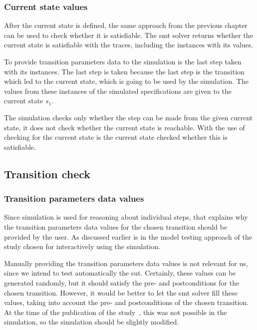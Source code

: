 \subsubsection*{Current state values}
After the current state is defined, the same approach from the previous chapter
can be used to check whether it is satisfiable. The \gls{smt} solver returns whether the
current state is satisfiable with the traces, including the instances with its
values.

To provide transition parameters data to the simulation is the last step taken
with its instances. The last step is taken because the last step is the
transition which led to the current state, which is going to be used by the
simulation. The values from these instances of the simulated specifications are
given to the current state $s_{1}$.

The simulation checks only whether the step can be made from the given current
state, it does not check whether the current state is reachable. With the use of
checking for the current state is the current state checked whether this is
satisfiable.

\subsection{Transition check}

\subsubsection*{Transition parameters data values}
Since simulation is used for reasoning about individual steps, that explains why
the transition parameters data values for the chosen transition should be
provided by the user. As discussed earlier is in the model testing approach
of the study \cite[p.6]{stoel_storm_vinju_bosman_2016} chosen for interactively
using the simulation.

Manually providing the transition parameters data values
is not relevant for us, since we intend to test automatically the \gls{sut}.
Certainly, these values can be generated randomly, but it should satisfy the
pre- and postconditions for the chosen transition. However, it would be
better to let the \gls{smt} solver fill these values, taking into account the pre- and
postconditions of the chosen transition. At the time of the publication of the
study~\cite{stoel_storm_vinju_bosman_2016}, this was not possible in the simulation, so
the simulation should be slightly modified.

